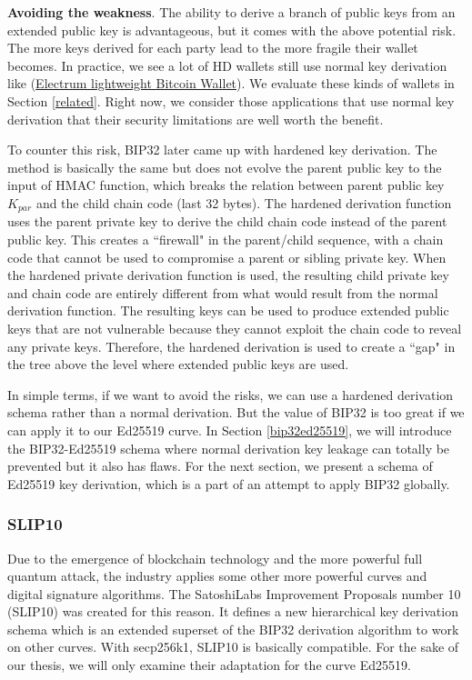     \bigskip
    {\textbf{Avoiding the weakness}}. The ability to derive a branch of public keys from an extended public key is advantageous, but it comes with the above potential risk. The more keys derived for each party lead to the more fragile their wallet becomes. In practice, we see a lot of HD wallets still use normal key derivation like (\href{https://electrum.org/#home}{Electrum lightweight Bitcoin Wallet}). We evaluate these kinds of wallets in Section \ref{related}. Right now, we consider those applications that use normal key derivation that their security limitations are well worth the benefit.

    To counter this risk, BIP32 later came up with hardened key derivation. The method is basically the same but does not evolve the parent public key to the input of HMAC function, which breaks the relation between parent public key $K_{par}$ and the child chain code (last 32 bytes). The hardened derivation function uses the parent private key to derive the child chain code instead of the parent public key. This creates a ``firewall" in the parent/child sequence, with a chain code that cannot be used to compromise a parent or sibling private key. When the hardened private derivation function is used, the resulting child private key and chain code are entirely different from what would result from the normal derivation function. The resulting keys can be used to produce extended public keys that are not vulnerable because they cannot exploit the chain code to reveal any private keys. Therefore, the hardened derivation is used to create a ``gap" in the tree above the level where extended public keys are used.

    In simple terms, if we want to avoid the risks, we can use a hardened derivation schema rather than a normal derivation. But the value of BIP32 is too great if we can apply it to our Ed25519 curve. In Section \ref{bip32ed25519}, we will introduce the BIP32-Ed25519 schema where normal derivation key leakage can totally be prevented but it also has flaws. For the next section, we present a schema of Ed25519 key derivation, which is a part of an attempt to apply BIP32 globally.

\subsubsection{SLIP10}
\label{SLIP10}

Due to the emergence of blockchain technology and the more powerful full quantum attack, the industry applies some other more powerful curves and digital signature algorithms. The SatoshiLabs Improvement Proposals number 10 (SLIP10) \cite{github/slip0010} was created for this reason. It defines a new hierarchical key derivation schema which is an extended superset of the BIP32 derivation algorithm to work on other curves. With secp256k1, SLIP10 is basically compatible. For the sake of our thesis, we will only examine their adaptation for the curve Ed25519.

